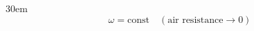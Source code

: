 \documentclass[border=4pt]{standalone}
\begin{document}
\begin{varwidth}{30em}
\large
\[ \omega = \text{const} \quad (\text{air resistance} \to 0) \]

\end{varwidth}
\end{document}
